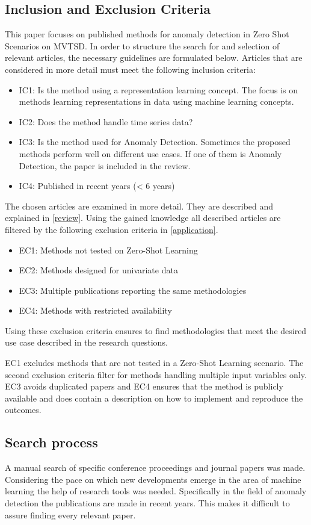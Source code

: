 \subsection{Inclusion and Exclusion Criteria}\label{criteria}
This paper focuses on published methods for anomaly detection in Zero Shot Scenarios on MVTSD. In order to structure the search for and selection of relevant articles, the necessary guidelines are formulated below. Articles that are considered in more detail must meet the following inclusion criteria:
\begin{itemize}
\item IC1: Is the method using a representation learning concept. The focus is on methods learning representations in data using machine learning concepts.
\item IC2: Does the method handle time series data?
\item IC3: Is the method used for Anomaly Detection. Sometimes the proposed methods perform well on different use cases. If one of them is Anomaly Detection, the paper is included in the review.
\item IC4: Published in recent years (< 6 years)
\end{itemize}
The chosen articles are examined in more detail. They are described and explained in \ref{review}. Using the gained knowledge all described articles are filtered by the following exclusion criteria in \ref{application}.
\begin{itemize}
\item EC1: Methods not tested on Zero-Shot Learning
\item EC2: Methods designed for univariate data
\item EC3: Multiple publications reporting the same methodologies
\item EC4: Methods with restricted availability
\end{itemize}
Using these exclusion criteria ensures to find methodologies that meet the desired use case described in the research questions.

EC1 excludes methods that are not tested in a Zero-Shot Learning scenario. The second exclusion criteria filter for methods handling multiple input variables only. EC3 avoids duplicated papers and EC4 ensures that the method is publicly available and does contain a description on how to implement and reproduce the outcomes.
\subsection{Search process}
A manual search of specific conference proceedings and journal papers was made. Considering the pace on which new developments emerge in the area of machine learning the help of research tools was needed. Specifically in the field of anomaly detection the publications are made in recent years. This makes it difficult to assure finding every relevant paper.


